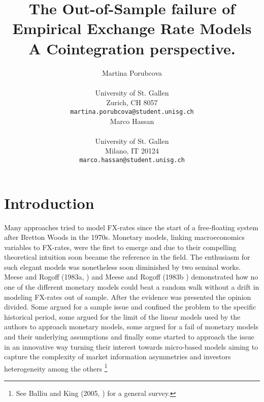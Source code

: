 \documentclass{article}
\title{The Out-of-Sample failure of Empirical Exchange Rate Models \textendash  A Cointegration perspective.}
\author{
  Martina Porubcova 	\\
			     	\\
  University of St. Gallen	\\
  Zurich, CH 8057 		\\
  \texttt{martina.porubcova@student.unisg.ch} \\
   \And
 Marco Hassan 		\\
				\\
  University of St. Gallen	\\
  Milano, IT 20124		\\
  \texttt{marco.hassan@student.unisg.ch} \\
}
\begin{document}
\maketitle

\begin{abstract}
\lipsum[1]
\end{abstract}




\section{Introduction}

%
%
Many approaches tried to model FX-rates since the start of a free-floating system after Bretton Woods in the 1970s. Monetary models, linking macroeconomics variables to FX-rates, were the first to emerge and due to their compelling theoretical intuition soon became the reference in the field. The enthusiasm for such elegant models was nonetheless soon diminished by two seminal works. Meese and Rogoff (1983a, \cite{MeeseRogoffa}) and Meese and Rogoff (1983b \cite{MeeseRogoffb}) demonstrated how no one of the different monetary models could beat a random walk without a drift in modeling FX-rates out of sample. After the evidence was presented the opinion divided. Some argued for a sample issue and confined the problem to the specific historical period, some argued for the limit of the linear models used by the authors to approach monetary models, some argued for a fail of monetary models and their underlying assumptions and finally some started to approach the issue in an innovative way turning their interest towards micro-based models aiming to capture the complexity of market information asymmetries and investors heterogeneity among the others \footnote{See Balliu and King (2005, \cite{BalliuKing}) for a general survey.}
\end{document}
